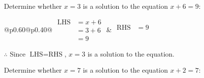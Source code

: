 \documentclass[12pt]{article}
\newcounter{minipagecount}
\begin{document}
\begin{multicols}{2}
\begin{minipage}[t]{0.40\textwidth}
    \noindent Determine whether \(x = 3\) is a solution to the equation \(x + 6 = 9\):
    \vspace{4pt}  %

    \noindent
    \renewcommand{\arraystretch}{1.3} %
    \begin{tabular}{@{}p{0.60\linewidth}@{}p{0.40\linewidth}@{}}
        \(\begin{aligned}
            \text{LHS} &= x + 6 \\
                    &= 3 + 6 \\
                    &= 9
        \end{aligned}\) &
        \(\begin{aligned}
            \text{RHS} &= 9\\
                    & \\
                    &
        \end{aligned}\)
    \end{tabular}
    \renewcommand{\arraystretch}{1.0} %
    \vspace{2pt}  %

    \noindent \(\therefore\) Since \(\text{LHS} = \text{RHS}\), \(x = 3\) is  a solution to the equation.

\end{minipage}

 \vspace*{16pt}
\newpage
\noindent{(\theminipagecount)}\hspace{0.1mm} %
\begin{minipage}[t]{0.40\textwidth} %

    \noindent Determine whether \(x = 7\) is a solution to the equation \(x + 2 = 7\):
    \vspace{4pt}  %


\end{minipage}
\end{multicols}
\end{document}
